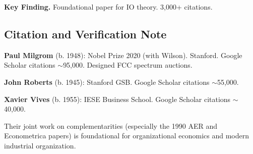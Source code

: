 \textbf{Key Finding.}
Foundational paper for IO theory. 3,000+ citations.


\subsection{Citation and Verification Note}

\textbf{Paul Milgrom} (b. 1948): Nobel Prize 2020 (with Wilson). Stanford.
Google Scholar citations $\sim$95,000. Designed FCC spectrum auctions.

\textbf{John Roberts} (b. 1945): Stanford GSB.
Google Scholar citations $\sim$55,000.

\textbf{Xavier Vives} (b. 1955): IESE Business School.
Google Scholar citations $\sim$40,000.

Their joint work on complementarities (especially the 1990 AER and
Econometrica papers) is foundational for organizational economics
and modern industrial organization.

